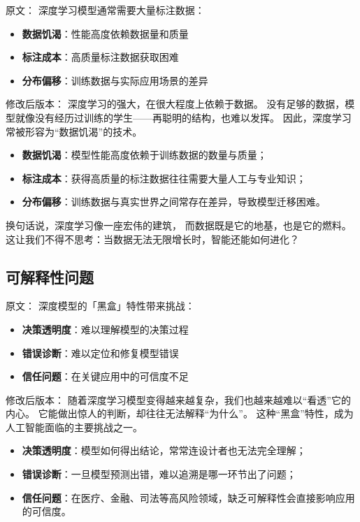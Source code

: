 原文：
深度学习模型通常需要大量标注数据：

\begin{itemize}
\item \textbf{数据饥渴}：性能高度依赖数据量和质量
\item \textbf{标注成本}：高质量标注数据获取困难
\item \textbf{分布偏移}：训练数据与实际应用场景的差异
\end{itemize}
修改后版本：
深度学习的强大，在很大程度上依赖于数据。  
没有足够的数据，模型就像没有经历过训练的学生——再聪明的结构，也难以发挥。  
因此，深度学习常被形容为“数据饥渴”的技术。

\begin{itemize}
\item \textbf{数据饥渴}：模型性能高度依赖于训练数据的数量与质量；
\item \textbf{标注成本}：获得高质量的标注数据往往需要大量人工与专业知识；
\item \textbf{分布偏移}：训练数据与真实世界之间常存在差异，导致模型迁移困难。
\end{itemize}

换句话说，深度学习像一座宏伟的建筑，  
而数据既是它的地基，也是它的燃料。  
这让我们不得不思考：当数据无法无限增长时，智能还能如何进化？



\subsection{可解释性问题}

原文：
深度模型的「黑盒」特性带来挑战：

\begin{itemize}
\item \textbf{决策透明度}：难以理解模型的决策过程
\item \textbf{错误诊断}：难以定位和修复模型错误
\item \textbf{信任问题}：在关键应用中的可信度不足
\end{itemize}
修改后版本：
随着深度学习模型变得越来越复杂，我们也越来越难以“看透”它的内心。  
它能做出惊人的判断，却往往无法解释“为什么”。  
这种“黑盒”特性，成为人工智能面临的主要挑战之一。

\begin{itemize}
\item \textbf{决策透明度}：模型如何得出结论，常常连设计者也无法完全理解；
\item \textbf{错误诊断}：一旦模型预测出错，难以追溯是哪一环节出了问题；
\item \textbf{信任问题}：在医疗、金融、司法等高风险领域，缺乏可解释性会直接影响应用的可信度。
\end{itemize}

